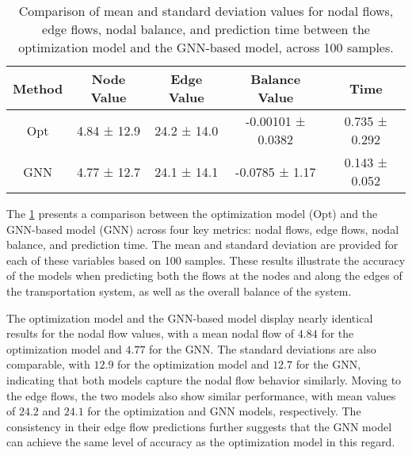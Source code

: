 %
%
\begin{table}
\centering
\begin{tabular}{|c|c|c|c|c|}
\hline
Method & Node Value & Edge Value & Balance Value & Time \\ \hline
Opt & 4.84 ± 12.9 & 24.2 ± 14.0 & -0.00101 ± 0.0382 & 0.735 ± 0.292 \\ \hline
GNN & 4.77 ± 12.7 & 24.1 ± 14.1 & -0.0785 ± 1.17 & 0.143 ± 0.052 \\ \hline
\end{tabular}
\caption{Comparison of mean and standard deviation values for nodal flows, edge flows, nodal balance, and prediction time between the optimization model and the GNN-based model, across 100 samples.}
\label{tab:dummy_base_f_results}

\end{table}




The \cref{tab:dummy_base_f_results} presents a comparison between the optimization model (Opt) and the GNN-based model (GNN) across four key metrics: nodal flows, edge flows, nodal balance, and prediction time. The mean and standard deviation are provided for each of these variables based on 100 samples. These results illustrate the accuracy of the models when predicting both the flows at the nodes and along the edges of the transportation system, as well as the overall balance of the system.

The optimization model and the GNN-based model display nearly identical results for the nodal flow values, with a mean nodal flow of $4.84$ for the optimization model and $4.77$ for the GNN. The standard deviations are also comparable, with $12.9$ for the optimization model and $12.7$ for the GNN, indicating that both models capture the nodal flow behavior similarly. Moving to the edge flows, the two models also show similar performance, with mean values of $24.2$ and $24.1$ for the optimization and GNN models, respectively. The consistency in their edge flow predictions further suggests that the GNN model can achieve the same level of accuracy as the optimization model in this regard.

